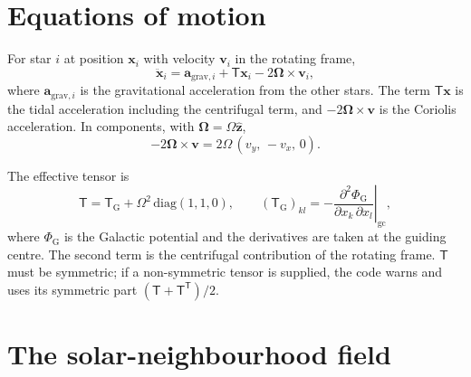 \documentclass[11pt,a4paper]{article}
\newcommand{\bx}{\mathbf{x}}
\newcommand{\bv}{\mathbf{v}}
\newcommand{\ba}{\mathbf{a}}
\newcommand{\T}{\mathsf{T}}
\newcommand{\bO}{\boldsymbol{\Omega}}
\begin{document}
\section{Equations of motion}

For star $i$ at position $\bx_i$ with velocity $\bv_i$ in the rotating
frame,
\begin{equation}
  \ddot{\bx}_i = \ba_{\mathrm{grav},i} + \T\bx_i - 2\bO\times\bv_i ,
  \label{eq:eom}
\end{equation}
where $\ba_{\mathrm{grav},i}$ is the gravitational acceleration from
the other stars. The term $\T\bx$ is the tidal acceleration including
the centrifugal term, and $-2\bO\times\bv$ is the Coriolis
acceleration. In components, with $\bO=\Omega\hat{\mathbf z}$,
\begin{equation}
  -2\bO\times\bv = 2\Omega\,(v_y,\,-v_x,\,0).
\end{equation}

The effective tensor is
\begin{equation}
  \T = \T_{\mathrm{G}} + \Omega^2\,\mathrm{diag}(1,1,0),
  \qquad
  (\T_{\mathrm{G}})_{kl} = -\left.\frac{\partial^2\Phi_{\mathrm{G}}}
  {\partial x_k\,\partial x_l}\right|_{\mathrm{gc}},
\end{equation}
where $\Phi_{\mathrm G}$ is the Galactic potential and the derivatives
are taken at the guiding centre. The second term is the centrifugal
contribution of the rotating frame. $\T$ must be symmetric; if a
non-symmetric tensor is supplied, the code warns and uses its
symmetric part $(\T+\T^{\mathsf T})/2$.

\section{The solar-neighbourhood field}
\label{sec:solar}
\end{document}
